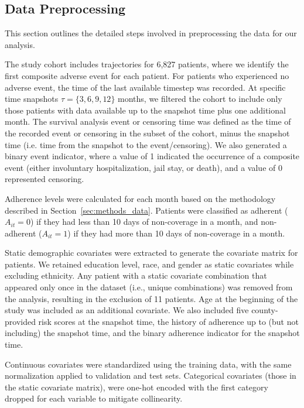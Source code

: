 
\subsection{Data Preprocessing}
\label{apd:preprocessing}
This section outlines the detailed steps involved in preprocessing the data for our analysis.

The study cohort includes trajectories for 6,827 patients, where we identify the first composite adverse event for each patient.
For patients who experienced no adverse event, the time of the last available timestep was recorded.
At specific time snapshots \(\tau=\{3, 6, 9, 12\}\) months, we filtered the cohort to include only those patients with data available up to the snapshot time plus one additional month.
The survival analysis event or censoring time was defined as the time of the recorded event or censoring in the subset of the cohort, minus the snapshot time (i.e. time from the snapshot to the event/censoring).
We also generated a binary event indicator, where a value of 1 indicated the occurrence of a composite event (either involuntary hospitalization, jail stay, or death), and a value of 0 represented censoring.

Adherence levels were calculated for each month based on the methodology described in Section~\ref{sec:methods_data}.
Patients were classified as adherent ($A_{it}=0$) if they had less than 10 days of non-coverage in a month, and non-adherent ($A_{it}=1$) if they had more than 10 days of non-coverage in a month.

Static demographic covariates were extracted to generate the covariate matrix for patients.
We retained education level, race, and gender as static covariates while excluding ethnicity.
Any patient with a static covariate combination that appeared only once in the dataset (i.e., unique combinations) was removed from the analysis, resulting in the exclusion of 11 patients.
Age at the beginning of the study was included as an additional covariate.
We also included five county-provided risk scores at the snapshot time, the history of adherence up to (but not including) the snapshot time, and the binary adherence indicator for the snapshot time.

Continuous covariates were standardized using the training data, with the same normalization applied to validation and test sets.
Categorical covariates (those in the static covariate matrix), were one-hot encoded with the first category dropped for each variable to mitigate collinearity.

